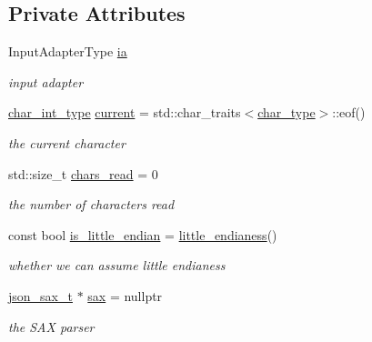 \subsection*{Private Attributes}
\begin{DoxyCompactItemize}
\item 
Input\+Adapter\+Type \hyperlink{classnlohmann_1_1detail_1_1binary__reader_a548c770e60f2285a931de4b7333c1ab0}{ia}
\begin{DoxyCompactList}\small\item\em input adapter \end{DoxyCompactList}\item 
\hyperlink{classnlohmann_1_1detail_1_1binary__reader_aa12ade9a8c0acaebef6399e3d446b970}{char\+\_\+int\+\_\+type} \hyperlink{classnlohmann_1_1detail_1_1binary__reader_ab47df98119524e9c7d9ff0b820913883}{current} = std\+::char\+\_\+traits$<$\hyperlink{classnlohmann_1_1detail_1_1binary__reader_abc20ff256868de6791b3646ab33fff76}{char\+\_\+type}$>$\+::eof()
\begin{DoxyCompactList}\small\item\em the current character \end{DoxyCompactList}\item 
std\+::size\+\_\+t \hyperlink{classnlohmann_1_1detail_1_1binary__reader_aa03c779d4512b5764895dc341b0ef902}{chars\+\_\+read} = 0
\begin{DoxyCompactList}\small\item\em the number of characters read \end{DoxyCompactList}\item 
const bool \hyperlink{classnlohmann_1_1detail_1_1binary__reader_ad615eba561e265165a80c95061af75b0}{is\+\_\+little\+\_\+endian} = \hyperlink{namespacenlohmann_1_1detail_ad2860d9bcd96cd7b8258a5b94674508c}{little\+\_\+endianess}()
\begin{DoxyCompactList}\small\item\em whether we can assume little endianess \end{DoxyCompactList}\item 
\hyperlink{classnlohmann_1_1detail_1_1binary__reader_a4c33ab78a0df5afd524f16887550436d}{json\+\_\+sax\+\_\+t} $\ast$ \hyperlink{classnlohmann_1_1detail_1_1binary__reader_aba4d89d9d38235f72f60332d6c385222}{sax} = nullptr
\begin{DoxyCompactList}\small\item\em the S\+AX parser \end{DoxyCompactList}\end{DoxyCompactItemize}


